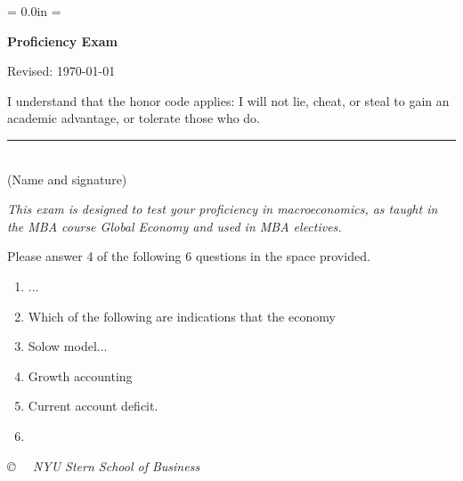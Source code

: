 \documentclass[letterpaper,12pt]{article}
\def\HeadName{Proficiency Exam}
\begin{document}
\parindent = 0.0in
\parskip = \bigskipamount
\thispagestyle{empty}%
\Head

\centerline{\large \bf \HeadName}%
\centerline{Revised:  \today}

\bigskip
I understand that the honor code applies: I will not lie, cheat, or
steal to gain an academic advantage, or tolerate those who do.

\begin{flushright}
\rule{4in}{0.5pt} \\ (Name and signature)
\end{flushright}

{\it This exam is designed to test your proficiency in macroeconomics,
as taught in the MBA course Global Economy and used in MBA electives.

Please answer 4 of the following 6 questions in the space provided.} 


\begin{enumerate}
\item ...



\item Which of the following are indications that the economy 


\item Solow model...  

\item Growth accounting


\item Current account deficit.  



\item 

\end{enumerate}



\vfill \centerline{\it \copyright \ \number\year 
\ NYU Stern School of Business}
\end{document}

